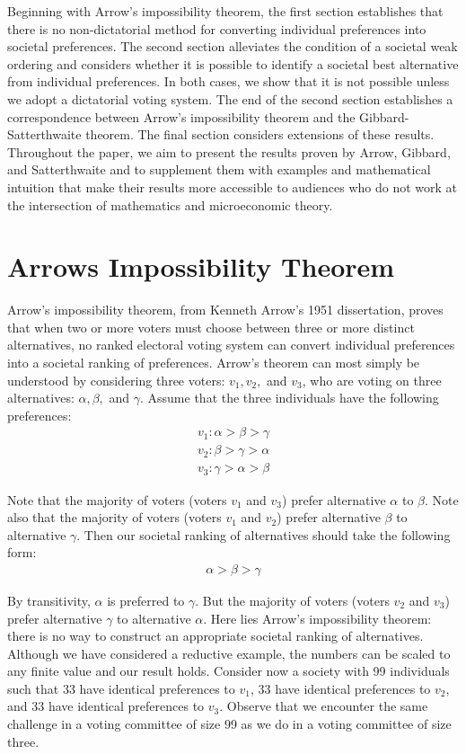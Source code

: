 \documentclass{amsart}
\theoremstyle{plain}
\begin{document}
Beginning with Arrow's impossibility theorem, the first section establishes that there is no non-dictatorial method for converting individual preferences into societal preferences. The second section alleviates the condition of a societal weak ordering and considers whether it is possible to identify a societal best alternative from individual preferences. In both cases, we show that it is not possible unless we adopt a dictatorial voting system. The end of the second section establishes a correspondence between Arrow's impossibility theorem and the Gibbard-Satterthwaite theorem. The final section considers extensions of these results. Throughout the paper, we aim to present the results proven by Arrow, Gibbard, and Satterthwaite and to supplement them with examples and mathematical intuition that make their results more accessible to audiences who do not work at the intersection of mathematics and microeconomic theory.

\section{Arrows Impossibility Theorem}

Arrow's impossibility theorem, from Kenneth Arrow's 1951 dissertation, proves that when two or more voters must choose between three or more distinct alternatives, no ranked electoral voting system can convert individual preferences into a societal ranking of preferences. Arrow's theorem can most simply be understood by considering three voters: $v_1, v_2,$ and $v_3$, who are voting on three alternatives: $\alpha, \beta, $ and $\gamma$. Assume that the three individuals have the following preferences:
\begin{align*}
    v_1: \alpha > \beta > \gamma \\
    v_2: \beta > \gamma > \alpha \\
    v_3: \gamma > \alpha > \beta
\end{align*}

\noindent Note that the majority of voters (voters $v_1$ and $v_3$) prefer alternative $\alpha$ to $\beta$. Note also that the majority of voters (voters $v_1$ and $v_2$) prefer alternative $\beta$ to alternative $\gamma$. Then our societal ranking of alternatives should take the following form: 
\begin{align*}
    \alpha > \beta > \gamma 
\end{align*}

\noindent By transitivity, $\alpha$ is preferred to $\gamma$. But the majority of voters (voters $v_2$ and $v_3$) prefer alternative $\gamma$ to alternative $\alpha$. Here lies Arrow's impossibility theorem: there is no way to construct an appropriate societal ranking of alternatives. Although we have considered a reductive example, the numbers can be scaled to any finite value and our result holds. Consider now a society with 99 individuals such that 33 have identical preferences to $v_1$, 33 have identical preferences to $v_2$, and 33 have identical preferences to $v_3$. Observe that we encounter the same challenge in a voting committee of size 99 as we do in a voting committee of size three. 
\end{document}
